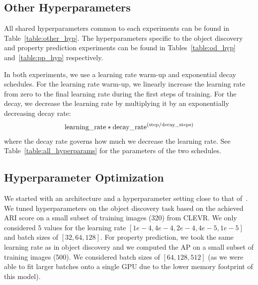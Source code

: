 \documentclass{article}
\begin{document}
\subsection{Other Hyperparameters}
\label{sec:app_hyp}
All shared hyperparameters common to each experiments can be found in Table~\ref{table:other_hyp}. The hyperparameters specific to the object discovery and property prediction experiments can be found in Tables~\ref{table:od_hyp} and~\ref{table:pp_hyp} respectively.

In both experiments, we use a learning rate warm-up and exponential decay schedules. For the learning rate warm-up, we linearly increase the learning rate from zero to the final learning rate during the first steps of training. For the decay, we decrease the learning rate by multiplying it by an exponentially decreasing decay rate:
\begin{align*}
    \textnormal{learning\_rate} * \textnormal{decay\_rate}^{(\textnormal{step} / \textnormal{decay\_steps})}
\end{align*}
where the decay rate governs how much we decrease the learning rate. See Table~\ref{table:all_hyperparams} for the parameters of the two schedules.

\subsection{Hyperparameter Optimization}
We started with an architecture and a hyperparameter setting close to that of~\citep{greff2019multi}. We tuned hyperparameters on the object discovery task based on the achieved ARI score on a small subset of training images (320) from CLEVR. We only considered $5$ values for the learning rate $[1e-4, 4e-4, 2e-4, 4e-5, 1e-5]$ and batch sizes of $[32, 64, 128]$.
For property prediction, we took the same learning rate as in object discovery and we computed the AP on a small subset of training images (500). We considered batch sizes of $[64, 128, 512]$ (as we were able to fit larger batches onto a single GPU due to the lower memory footprint of this model).
\end{document}
